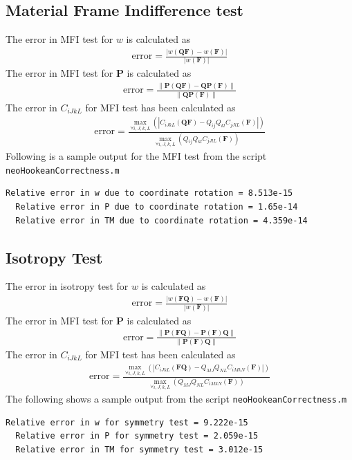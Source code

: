 \documentclass[../main.tex]{subfiles}
\begin{document}
\subsection{Material Frame Indifference test}
The error in MFI test for $w$ is calculated as
\begin{align*}
  \text{error} = \frac{|w(\mathbf{QF}) - w(\mathbf{F})|}{|w(\mathbf{F})|}
\end{align*}
The error in MFI test for $\mathbf{P}$ is calculated as
\begin{align*}
  \text{error} = \frac{\lVert\mathbf{P}(\mathbf{Q}\mathbf{F}) -\mathbf{Q}\mathbf{P}(\mathbf{F})\rVert}{\lVert\mathbf{Q}\mathbf{P}(\mathbf{F})\rVert}
\end{align*}
The error in $C_{iJkL}$ for MFI test has been calculated as
\begin{align*}
  \text{error} =\frac{\underset{\forall i,J,k,L}{\max}\left(|C_{iJkL}(\mathbf{Q}\mathbf{F})-Q_{ij}Q_{kl}C_{jJlL}(\mathbf{F})|\right)}{\underset{\forall i,J,k,L}{\max}\left(Q_{ij}Q_{kl}C_{jJlL}(\mathbf{F})\right)}
\end{align*}
Following is a sample output for the MFI test from the script \texttt{neoHookeanCorrectness.m}
\begin{lstlisting}[frame=single]
  Relative error in w due to coordinate rotation = 8.513e-15
  Relative error in P due to coordinate rotation = 1.65e-14
  Relative error in TM due to coordinate rotation = 4.359e-14
\end{lstlisting}

\subsection{Isotropy Test}
The error in isotropy test for $w$ is calculated as
\begin{align*}
  \text{error} = \frac{|w(\mathbf{FQ}) - w(\mathbf{F})|}{|w(\mathbf{F})|}
\end{align*}
The error in MFI test for $\mathbf{P}$ is calculated as
\begin{align*}
  \text{error} = \frac{\lVert\mathbf{P}(\mathbf{F}\mathbf{Q}) -\mathbf{P}(\mathbf{F})\mathbf{Q}\rVert}{\lVert\mathbf{P}(\mathbf{F})\mathbf{Q}\rVert}
\end{align*}
The error in $C_{iJkL}$ for MFI test has been calculated as
\begin{align*}
  \text{error} =\frac{\underset{\forall i,J,k,L}{\max}\left(|C_{iJkL}(\mathbf{F}\mathbf{Q})-Q_{MJ}Q_{NL}C_{iMkN}(\mathbf{F})|\right)}{\underset{\forall i,J,k,L}{\max}\left(Q_{MJ}Q_{NL}C_{iMkN}(\mathbf{F})\right)}
\end{align*}
The following shows a sample output from the script \texttt{neoHookeanCorrectness.m}
\begin{lstlisting}[frame=single]
  Relative error in w for symmetry test = 9.222e-15
  Relative error in P for symmetry test = 2.059e-15
  Relative error in TM for symmetry test = 3.012e-15
\end{lstlisting}
\end{document}
